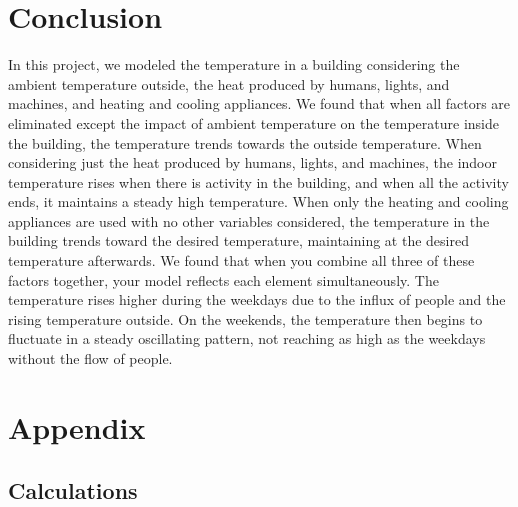 \documentclass[titlepage]{article}
\begin{document}
\section{Conclusion}
In this project, we modeled the temperature in a building considering the ambient temperature outside, the heat produced by humans, lights, and machines, and heating and cooling appliances.
We found that when all factors are eliminated except the impact of ambient temperature on the temperature inside the building, the temperature trends towards the outside temperature. 
When considering just the heat produced by humans, lights, and machines, the indoor temperature rises when there is activity in the building, and when all the activity ends, it maintains a steady high temperature.
When only the heating and cooling appliances are used with no other variables considered, the temperature in the building trends toward the desired temperature, maintaining at the desired temperature afterwards. 
We found that when you combine all three of these factors together, your model reflects each element simultaneously. The temperature rises higher during the weekdays due to the influx of people and the rising temperature outside. 
On the weekends, the temperature then begins to fluctuate in a steady oscillating pattern, not reaching as high as the weekdays without the flow of people.


\newpage
\section{Appendix}

\subsection{Calculations}
\end{document}
